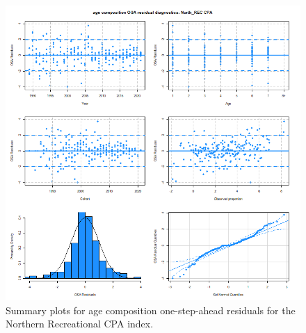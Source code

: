 \documentclass[
]{article}
\begin{document}
\begin{figure}

{\centering \includegraphics[width=1\linewidth]{../2023.RT.Runs/Run34/plots_png/diagnostics/OSA_resid_paa_6panel_North_REC_CPA} 

}

\caption{Summary plots for age composition one-step-ahead residuals for the Northern Recreational CPA index.}\label{fig:osa-North-reccpa-paa-summ}
\end{figure}
\end{document}

